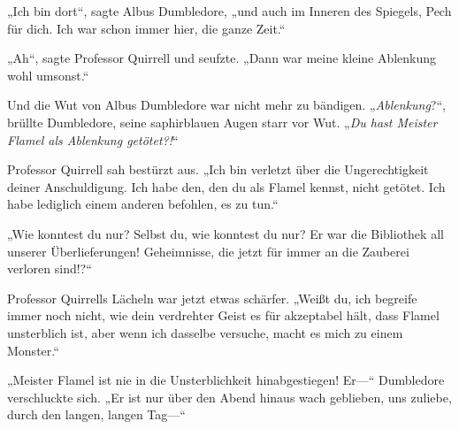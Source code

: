 „Ich bin dort“, sagte Albus Dumbledore, „und auch im Inneren des Spiegels, Pech für dich. Ich war schon immer hier, die ganze Zeit.“

„Ah“, sagte Professor Quirrell und seufzte. „Dann war meine kleine Ablenkung wohl umsonst.“

Und die Wut von Albus Dumbledore war nicht mehr zu bändigen.
„\emph{Ablenkung}?“, brüllte Dumbledore, seine saphirblauen Augen starr vor Wut. „\emph{Du hast Meister Flamel als Ablenkung getötet?!}“

Professor Quirrell sah bestürzt aus. „Ich bin verletzt über die Ungerechtigkeit deiner Anschuldigung. Ich habe den, den du als Flamel kennst, nicht getötet. Ich habe lediglich einem anderen befohlen, es zu tun.“

„Wie konntest du nur? Selbst du, wie konntest du nur? Er war die Bibliothek all unserer Überlieferungen! Geheimnisse, die jetzt für immer an die Zauberei verloren sind!?“

Professor Quirrells Lächeln war jetzt etwas schärfer. „Weißt du, ich begreife immer noch nicht, wie dein verdrehter Geist es für akzeptabel hält, dass Flamel unsterblich ist, aber wenn ich dasselbe versuche, macht es mich zu einem Monster.“

„Meister Flamel ist nie in die Unsterblichkeit hinabgestiegen! Er—“ Dumbledore verschluckte sich. „Er ist nur über den Abend hinaus wach geblieben, uns zuliebe, durch den langen, langen Tag—“


